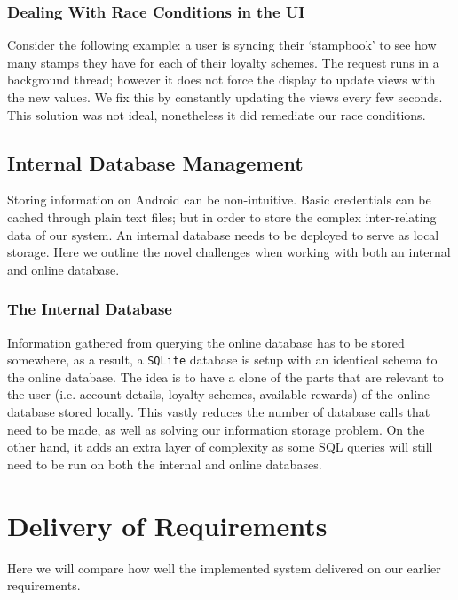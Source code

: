 \subsubsection{Dealing With Race Conditions in the UI}
Consider the following example: a user is syncing their `stampbook' to see how many stamps they have for each of their loyalty schemes. The request runs in a background thread; however it does not force the display to update views with the new values. We fix this by constantly updating the views every few seconds. This solution was not ideal, nonetheless it did remediate our race conditions.


\subsection{Internal Database Management}
Storing information on Android can be non-intuitive. Basic credentials can be cached through plain text files; but in order to store the complex inter-relating data of our system. An internal database needs to be deployed to serve as local storage. Here we outline the novel challenges when working with both an internal and online database.
\subsubsection{The Internal Database}
Information gathered from querying the online database has to be stored somewhere, as a result, a \texttt{SQLite} database is setup with an identical schema to the online database. The idea is to have a clone of the parts that are relevant to the user (i.e. account details, loyalty schemes, available rewards) of the online database stored locally. This vastly reduces the number of database calls that need to be made, as well as solving our information storage problem. On the other hand, it adds an extra layer of complexity as some SQL queries will still need to be run on both the internal and online databases.
\section{Delivery of Requirements}
Here we will compare how well the implemented system delivered on our earlier requirements.

